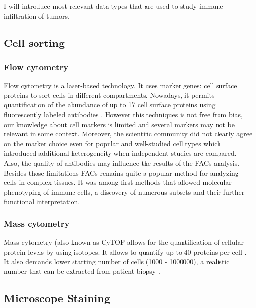 \documentclass[12pt,]{book}
\theoremstyle{definition}
\theoremstyle{definition}
\theoremstyle{definition}
\theoremstyle{remark}
\begin{document}
I will introduce most relevant data types that are used to study immune
infiltration of tumors.

\hypertarget{facs}{%
\subsection{Cell sorting}\label{facs}}

\hypertarget{flow-cytometry}{%
\subsubsection{Flow cytometry}\label{flow-cytometry}}

Flow cytometry is a laser-based technology. It uses marker genes: cell
surface proteins to sort cells in different compartments. Nowadays, it
permits quantification of the abundance of up to 17 cell surface
proteins using fluorescently labeled antibodies \citep{Papalexi2017}.
However this techniques is not free from bias, our knowledge about cell
markers is limited and several markers may not be relevant in some
context. Moreover, the scientific community did not clearly agree on the
marker choice even for popular and well-studied cell types which
introduced additional heterogeneity when independent studies are
compared. Also, the quality of antibodies may influence the results of
the FACs analysis. Besides those limitations FACs remains quite a
popular method for analyzing cells in complex tissues. It was among
first methods that allowed molecular phenotyping of immune cells, a
discovery of numerous subsets and their further functional
interpretation.

\hypertarget{mass-cytometry}{%
\subsubsection{Mass cytometry}\label{mass-cytometry}}

Mass cytometry (also known as CyTOF allows for the quantification of
cellular protein levels by using isotopes. It allows to quantify up to
40 proteins per cell \citep{Papalexi2017}. It also demands lower
starting number of cells (1000 - 1000000), a realistic number that can
be extracted from patient biopsy \citep{Lyons2017}.

\hypertarget{staining}{%
\subsection{Microscope Staining}\label{staining}}
\end{document}
